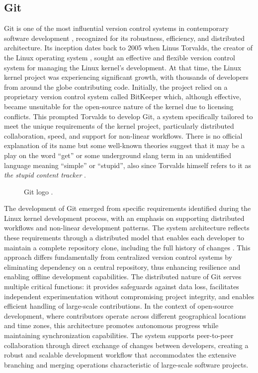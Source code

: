 \subsection{Git}
\label{sec:git}
Git \cite{torvalds_git_nodate} is one of the most influential version control systems in contemporary software development \cite{loeliger_version_2012,bird_promises_2009}, recognized for its robustness, efficiency, and distributed architecture. Its inception dates back to 2005 when Linus Torvalds, the creator of the Linux operating system \cite{torvalds_linux_nodate}, sought an effective and flexible version control system for managing the Linux kernel's development. At that time, the Linux kernel project was experiencing significant growth, with thousands of developers from around the globe contributing code. Initially, the project relied on a proprietary version control system called BitKeeper which, although effective, became unsuitable for the open-source nature of the kernel due to licensing conflicts. This prompted Torvalds to develop Git, a system specifically tailored to meet the unique requirements of the kernel project, particularly distributed collaboration, speed, and support for non-linear workflows. There is no official explanation of its name but some well-known theories suggest that it may be a play on the word ``get'' or some underground slang term in an unidentified language meaning ``simple'' or ``stupid'', also since Torvalds himself refers to it as \emph{the stupid content tracker} \cite{torvalds_git_nodate}.
\begin{figure}[!t]
  \centering
  
  \caption{Git logo \cite{torvalds_git_nodate}.}
  \label{fig:gitlogo}
\end{figure}

The development of Git emerged from specific requirements identified during the Linux kernel development process, with an emphasis on supporting distributed workflows and non-linear development patterns. The system architecture reflects these requirements through a distributed model that enables each developer to maintain a complete repository clone, including the full history of changes \cite{rodriguez-bustos_how_2012}. This approach differs fundamentally from centralized version control systems by eliminating dependency on a central repository, thus enhancing resilience and enabling offline development capabilities. The distributed nature of Git serves multiple critical functions: it provides safeguards against data loss, facilitates independent experimentation without compromising project integrity, and enables efficient handling of large-scale contributions. In the context of open-source development, where contributors operate across different geographical locations and time zones, this architecture promotes autonomous progress while maintaining synchronization capabilities. The system supports peer-to-peer collaboration through direct exchange of changes between developers, creating a robust and scalable development workflow that accommodates the extensive branching and merging operations characteristic of large-scale software projects.

